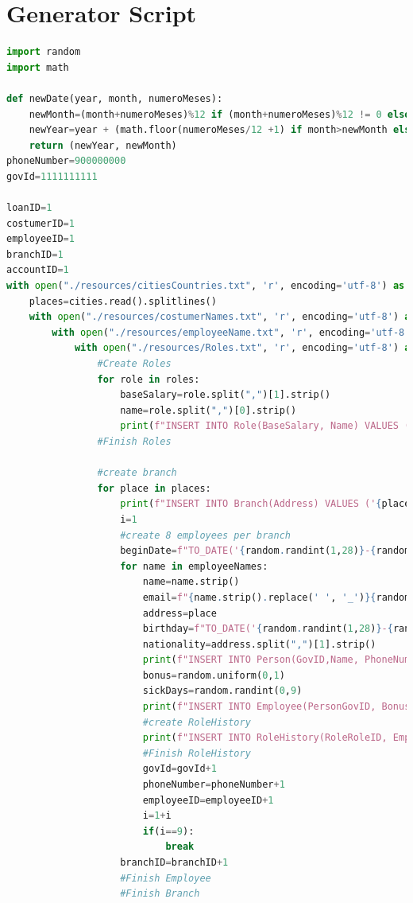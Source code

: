 \documentclass[a4paper, 10pt]{article}
\begin{document}
\section{Generator Script}
\begin{lstlisting}[language=python]
import random
import math

def newDate(year, month, numeroMeses):
    newMonth=(month+numeroMeses)%12 if (month+numeroMeses)%12 != 0 else 12
    newYear=year + (math.floor(numeroMeses/12 +1) if month>newMonth else math.floor(numeroMeses/12))
    return (newYear, newMonth)
phoneNumber=900000000
govId=1111111111

loanID=1
costumerID=1
employeeID=1
branchID=1
accountID=1
with open("./resources/citiesCountries.txt", 'r', encoding='utf-8') as cities:
    places=cities.read().splitlines()
    with open("./resources/costumerNames.txt", 'r', encoding='utf-8') as costumerNames: 
        with open("./resources/employeeName.txt", 'r', encoding='utf-8') as employeeNames: 
            with open("./resources/Roles.txt", 'r', encoding='utf-8') as roles:
                #Create Roles
                for role in roles:
                    baseSalary=role.split(",")[1].strip()
                    name=role.split(",")[0].strip()
                    print(f"INSERT INTO Role(BaseSalary, Name) VALUES ({baseSalary}, '{name}');")
                #Finish Roles

                #create branch
                for place in places:
                    print(f"INSERT INTO Branch(Address) VALUES ('{place}');")
                    i=1
                    #create 8 employees per branch
                    beginDate=f"TO_DATE('{random.randint(1,28)}-{random.randint(1,12)}-{random.randint(2001,2018)}','DD-MM-YYYY')"
                    for name in employeeNames:
                        name=name.strip()
                        email=f"{name.strip().replace(' ', '_')}{random.randint(0,100)}@sapo.pt"
                        address=place
                        birthday=f"TO_DATE('{random.randint(1,28)}-{random.randint(1,12)}-{random.randint(1950,2000)}','DD-MM-YYYY')"
                        nationality=address.split(",")[1].strip()
                        print(f"INSERT INTO Person(GovID,Name, PhoneNumber, Email, Address, Birthday, Nationality) VALUES ({govId},'{name}','{phoneNumber}', '{email}', '{address}', {birthday}, '{nationality}');")
                        bonus=random.uniform(0,1)
                        sickDays=random.randint(0,9)
                        print(f"INSERT INTO Employee(PersonGovID, Bonus, SickDays) VALUES ({govId},{format(bonus, '.4f')},{sickDays});")
                        #create RoleHistory
                        print(f"INSERT INTO RoleHistory(RoleRoleID, EmployeeEmployeeID, BranchBranchId, BeginDate, EndDate) VALUES ({i},{employeeID},{branchID},{beginDate},NULL);")
                        #Finish RoleHistory
                        govId=govId+1
                        phoneNumber=phoneNumber+1
                        employeeID=employeeID+1
                        i=1+i
                        if(i==9):
                            break
                    branchID=branchID+1
                    #Finish Employee
                    #Finish Branch


\end{lstlisting}
\end{document}
